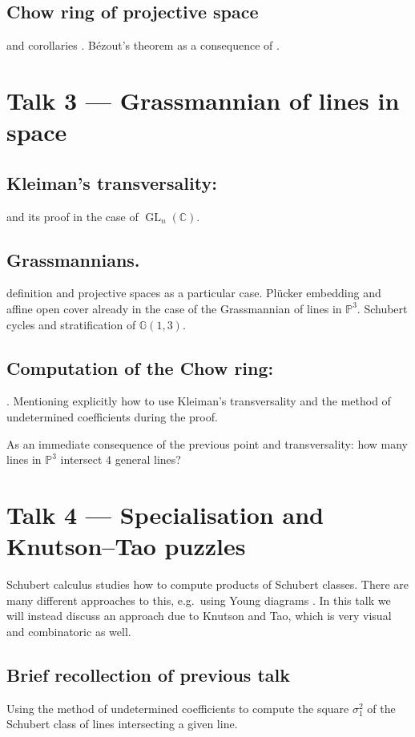 \documentclass[A4paper, 12pt, british, reqno]{amsart}
\newcommand{\C}{\mathbb{C}} %
\newcommand{\bbG}{\mathbb{G}}
\renewcommand{\P}{\mathbb{P}} %
\theoremstyle{plain}
\theoremstyle{definition}
\theoremstyle{remark}
\theoremstyle{plain}
\theoremstyle{definition}
\theoremstyle{remark}
\theoremstyle{plain}
\theoremstyle{definition}
\theoremstyle{remark}
\DeclareMathOperator{\GL}{GL}
\begin{document}
\subsection{Chow ring of projective space} \cite[Thm.~2.1]{eh16} and corollaries \cite[Cor.~2.2 and Cor.~2.3]{eh16}.
Bézout's theorem as a consequence of \cite[Thm.~2.1]{eh16}.

\section{Talk 3 --- Grassmannian of lines in space}

\subsection{Kleiman's transversality:} \cite[Thm.~1.7]{eh16} and its proof in the case of $\GL_{n}(\C)$.

\subsection{Grassmannians.}
definition and projective spaces as a particular case.
Pl\"{u}cker embedding and affine open cover already in the case of the Grassmannian of lines in $\P^{3}$.
Schubert cycles and stratification of $\bbG(1,3)$.

\subsection{Computation of the Chow ring:} \cite[Thm.~3.10]{eh16}.
Mentioning explicitly how to use Kleiman's transversality and the method of undetermined coefficients during the proof.

As an immediate consequence of the previous point and transversality: how many lines in $\P^{3}$ intersect $4$ general lines?

\section{Talk 4 --- Specialisation and Knutson--Tao puzzles}

Schubert calculus studies how to compute products of Schubert classes.
There are many different approaches to this, e.g.~using Young diagrams \cite[\S 4.5]{eh16}.
In this talk we will instead discuss an approach due to Knutson and Tao, which is very visual and combinatoric as well.


\subsection{Brief recollection of previous talk}
Using the method of undetermined coefficients to compute the square $\sigma_{1}^{2}$ of the Schubert class of lines intersecting a given line.
\end{document}
